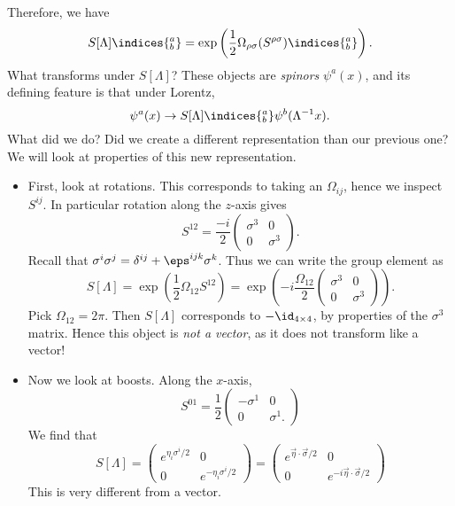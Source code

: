 \documentclass[12pt]{article}
\begin{document}
Therefore, we have
\[
	S[\Lambda]\indices{^{a}_{b}} = \exp \left( \frac 12 \Omega_{\rho\sigma} (S^{\rho\sigma})\indices{^{a}_{b}} \right).
\]
What transforms under $S[\Lambda]$? These objects are \emph{spinors} $\psi^{a}(x)$, and its defining feature is that under Lorentz,
\[
	\psi^{a}(x) \to S[\Lambda]\indices{^{a}_{b}} \psi^{b}(\Lambda^{-1} x).
\]
What did we do? Did we create a different representation than our previous one? We will look at properties of this new representation.
\begin{itemize}
	\item First, look at rotations. This corresponds to taking an $\Omega_{ij}$, hence we inspect $S^{ij}$. In particular rotation along the $z$-axis gives
		\[
			S^{12} = \frac{-i}2
			\begin{pmatrix}
				\sigma^{3} & 0 \\
				0 & \sigma^3
			\end{pmatrix}.
		\]
		Recall that $\sigma^{i} \sigma^{j} = \delta^{ij} + \eps^{ijk} \sigma^{k}$. Thus we can write the group element as
		\[
			S[\Lambda] = \exp \left( \frac 12 \Omega_{12} S^{12} \right) = \exp \left( -i\frac{\Omega_{12}}{2}
				\begin{pmatrix}
					\sigma^{3} & 0 \\
					0 & \sigma^{3}
				\end{pmatrix}
				\right).
		\]
		Pick $\Omega_{12} = 2 \pi$. Then $S[\Lambda]$ corresponds to $-\id_{4 \times 4}$, by properties of the $\sigma^{3}$ matrix. Hence this object is \emph{not a vector}, as it does not transform like a vector!
	\item Now we look at boosts. Along the $x$-axis,
		\[
		S^{01} = \frac 12
		\begin{pmatrix}
			-\sigma^{1} & 0 \\
			0 & \sigma^{1}.
		\end{pmatrix}
		\]
		We find that
		\[
			S[\Lambda] =
			\begin{pmatrix}
				e^{\eta_i \sigma^i/2} & 0 \\
				0 & e^{- \eta_i \sigma^i / 2}
			\end{pmatrix}
			=
			\begin{pmatrix}
				e^{\overrightarrow \eta \cdot \overrightarrow \sigma/2} & 0 \\
				0 & e^{-i \overrightarrow\eta \cdot \overrightarrow \sigma/2}
			\end{pmatrix}
		\]
		This is very different from a vector.
\end{itemize}
\end{document}
